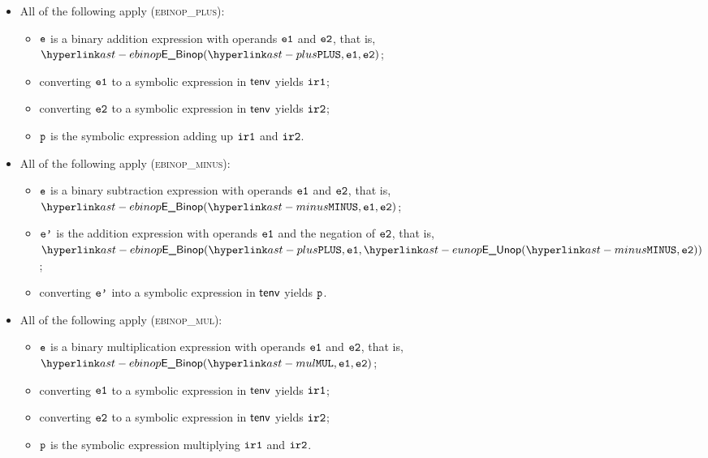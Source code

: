 \begin{itemize}
  \item All of the following apply (\textsc{ebinop\_plus}):
  \begin{itemize}
    \item $\texttt{e}$ is a binary addition expression with operands $\texttt{e1}$ and $\texttt{e2}$, that is, \\ $\EBinop(\PLUS, \veone, \vetwo)$;
    \item converting $\texttt{e1}$ to a symbolic expression in $\textsf{tenv}$ yields $\texttt{ir1}$\ProseOrTypeErrorOrBot;
    \item converting $\texttt{e2}$ to a symbolic expression in $\textsf{tenv}$ yields $\texttt{ir2}$\ProseOrTypeErrorOrBot;
    \item $\texttt{p}$ is the symbolic expression adding up $\texttt{ir1}$ and $\texttt{ir2}$.
  \end{itemize}

  \item All of the following apply (\textsc{ebinop\_minus}):
  \begin{itemize}
    \item $\texttt{e}$ is a binary subtraction expression with operands $\texttt{e1}$ and $\texttt{e2}$, that is, \\ $\EBinop(\MINUS, \veone, \vetwo)$;
    \item $\texttt{e'}$ is the addition expression with operands $\texttt{e1}$ and the negation of $\texttt{e2}$, that is, \\ $\EBinop(\PLUS, \veone, \EUnop(\MINUS, \vetwo))$;
    \item converting $\texttt{e'}$ into a symbolic expression in $\textsf{tenv}$ yields $\texttt{p}$\ProseOrTypeErrorOrBot.
  \end{itemize}

  \item All of the following apply (\textsc{ebinop\_mul}):
  \begin{itemize}
    \item $\texttt{e}$ is a binary multiplication expression with operands $\texttt{e1}$ and $\texttt{e2}$, that is, \\ $\EBinop(\MUL, \veone, \vetwo)$;
    \item converting $\texttt{e1}$ to a symbolic expression in $\textsf{tenv}$ yields $\texttt{ir1}$\ProseOrTypeErrorOrBot;
    \item converting $\texttt{e2}$ to a symbolic expression in $\textsf{tenv}$ yields $\texttt{ir2}$\ProseOrTypeErrorOrBot;
    \item $\texttt{p}$ is the symbolic expression multiplying $\texttt{ir1}$ and $\texttt{ir2}$.
  \end{itemize}


\end{itemize}
